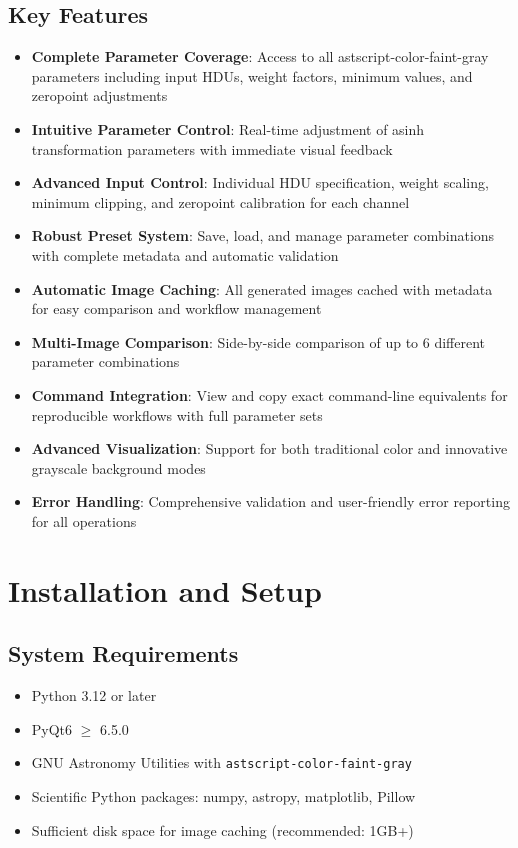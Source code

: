 \documentclass[11pt,a4paper]{article}
\begin{document}
\subsection{Key Features}

\begin{itemize}[leftmargin=*]
\item \textbf{Complete Parameter Coverage}: Access to all
astscript-color-faint-gray parameters including input HDUs, weight factors,
minimum values, and zeropoint adjustments
\item \textbf{Intuitive Parameter Control}: Real-time adjustment of asinh
transformation parameters with immediate visual feedback
\item \textbf{Advanced Input Control}: Individual HDU specification, 
weight scaling, minimum clipping, and zeropoint calibration for each channel
\item \textbf{Robust Preset System}: Save, load, and manage parameter
combinations with complete metadata and automatic validation
\item \textbf{Automatic Image Caching}: All generated images cached with
metadata for easy comparison and workflow management
\item \textbf{Multi-Image Comparison}: Side-by-side comparison of up to 6
different parameter combinations
\item \textbf{Command Integration}: View and copy exact command-line
equivalents for reproducible workflows with full parameter sets
\item \textbf{Advanced Visualization}: Support for both traditional color
and innovative grayscale background modes
\item \textbf{Error Handling}: Comprehensive validation and user-friendly
error reporting for all operations
\end{itemize}

\section{Installation and Setup}

\subsection{System Requirements}

\begin{itemize}[leftmargin=*]
\item Python 3.12 or later
\item PyQt6 $\geq$ 6.5.0
\item GNU Astronomy Utilities with \texttt{astscript-color-faint-gray}
\item Scientific Python packages: numpy, astropy, matplotlib, Pillow
\item Sufficient disk space for image caching (recommended: 1GB+)
\end{itemize}
\end{document}
